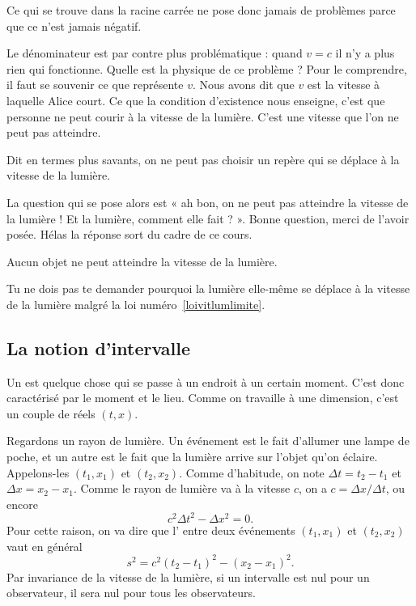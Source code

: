 Ce qui se trouve dans la racine carrée ne pose donc jamais de problèmes parce que ce n'est jamais négatif.

Le dénominateur est par contre plus problématique : quand \( v=c\) il n'y a plus rien qui fonctionne. Quelle est la physique de ce problème ? Pour le comprendre, il faut se souvenir ce que représente \( v\). Nous avons dit que \( v\) est la vitesse à laquelle Alice court. Ce que la condition d'existence nous enseigne, c'est que personne ne peut courir à la vitesse de la lumière. C'est une vitesse que l'on ne peut pas atteindre.

Dit en termes plus savants, on ne peut pas choisir un repère qui se déplace à la vitesse de la lumière.

La question qui se pose alors est « ah bon, on ne peut pas atteindre la vitesse de la lumière ! Et la lumière, comment elle fait ? ». Bonne question, merci de l'avoir posée. Hélas la réponse sort du cadre de ce cours.

\begin{loiphyz}\label{loivitlumlimite}
	Aucun objet ne peut atteindre la vitesse de la lumière.
\end{loiphyz}

\begin{loiphyz}
	Tu ne dois pas te demander pourquoi la lumière elle-même se déplace à la vitesse de la lumière malgré la loi numéro~\ref{loivitlumlimite}.
\end{loiphyz}

\subsection{La notion d'intervalle}


Un  est quelque chose qui se passe à un endroit à un certain moment. C'est donc caractérisé par le moment et le lieu. Comme on travaille à une dimension, c'est un couple de réels \( (t,x)\).

Regardons un rayon de lumière. Un événement est le fait d'allumer une lampe de poche, et un autre est le fait que la lumière arrive sur l'objet qu'on éclaire. Appelons-les \( (t_1,x_1)\) et \( (t_2,x_2)\). Comme d'habitude, on note \( \Delta t=t_2-t_1\) et \( \Delta x=x_2-x_1\). Comme le rayon de lumière va à la vitesse \( c\), on a \( c=\Delta x/\Delta t\), ou encore
\[
	c^2\Delta t^2-\Delta x^2=0.
\]
Pour cette raison, on va dire que l' entre deux événements \( (t_1,x_1)\) et \( (t_2,x_2)\) vaut en général
\begin{equation}
	s^2=c^2(t_2-t_1)^2-(x_2-x_1)^2.
\end{equation}
Par invariance de la vitesse de la lumière, si un intervalle est nul pour un observateur, il sera nul pour tous les observateurs.


